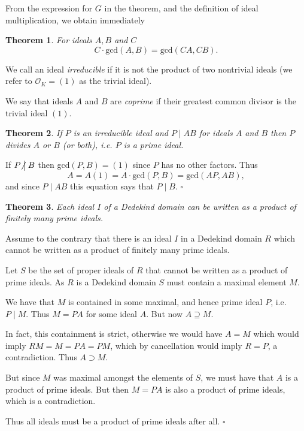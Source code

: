 \documentclass[10pt]{article}
\newcommand{\Op}{\mathcal{O}}
\newcommand{\qed}{\square}
\def\notdivides{\mathrel{\kern-3pt\not\!\kern4.5pt\bigm|}}
\def\nmid{\notdivides}
\newtheorem{theorem}{Theorem}[section]
\newenvironment{proof}[1][Proof]{\begin{trivlist}
\item[\hskip \labelsep {\bfseries #1}]}{\end{trivlist}}
\newenvironment{definition}[1][Definition]{\begin{trivlist}
\item[\hskip \labelsep {\bfseries #1}]}{\end{trivlist}}
\begin{document}
From the expression for $G$ in the theorem, and the definition of ideal multiplication, we obtain
immediately

\begin{theorem}
For ideals $A, B$ and $C$
$$C\cdot \mbox{gcd}(A, B) = \mbox{gcd}(CA, CB).$$
\end{theorem}

\begin{definition}
We call an ideal \emph{irreducible} if it is not the product of two nontrivial ideals (we refer to $\Op_K = (1)$ as the trivial ideal).
\end{definition}

\begin{definition}
We say that ideals $A$ and $B$ are \emph{coprime} if their greatest common divisor is the trivial ideal $(1)$.
\end{definition} 

\begin{theorem}
If $P$ is an irreducible ideal and $P \mid AB$ for ideals $A$ and $B$ then $P$ divides $A$ or $B$ (or both), i.e. $P$ is a prime ideal.
\end{theorem}

\begin{proof}
If $P \nmid B$ then gcd$(P, B) = (1)$ since $P$ has no
other factors. Thus
$$A = A(1) = A\cdot\mbox{gcd}(P, B) =
\mbox{gcd}(AP, AB),$$
and since $P \mid AB$ this equation says that $P \mid B$. $\qed$
\end{proof}

\begin{theorem}
Each ideal $I$ of a Dedekind domain can be written as a product of finitely many prime ideals.
\end{theorem}

\begin{proof}
Assume to the contrary that there is an ideal $I$ in a Dedekind domain $R$ which cannot be written as a product of finitely many prime ideals.

Let $S$ be the set of proper ideals of $R$ that cannot be written as a product of prime ideals. As $R$ is a Dedekind domain $S$ must contain a maximal element $M$.

We have that $M$ is contained in some maximal, and hence prime ideal $P$, i.e. $P \mid M$. Thus $M = PA$ for some ideal $A$. But now $A \supseteq M$. 

In fact, this containment is strict, otherwise we would have $A = M$ which would imply $RM = M = PA = PM$, which by cancellation would imply $R = P$, a contradiction. Thus $A \supset M$. 

But since $M$ was maximal amongst the elements of $S$, we must have that $A$ is a product of prime ideals. But then $M = PA$ is also a product of prime ideals, which is a contradiction.

Thus all ideals must be a product of prime ideals after all. $\qed$
\end{proof}
\end{document}
